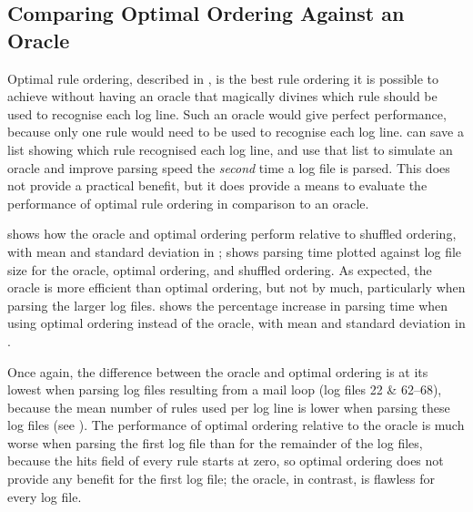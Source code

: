 
\FloatBarrier{}

\subsection{Comparing Optimal Ordering Against an Oracle}

\label{perfect rule ordering}

Optimal rule ordering, described in , is the best rule ordering it is possible to achieve without
having an oracle that magically divines which rule should be used to
recognise each log line.  Such an oracle would give perfect performance,
because only one rule would need to be used to recognise each log line.
\parsername{} can save a list showing which rule recognised each log line,
and use that list to simulate an oracle and improve parsing speed the
\textit{second\/} time a log file is parsed.  This does not provide a
practical benefit, but it does provide a means to evaluate the performance
of optimal rule ordering in comparison to an oracle.

 shows how the oracle and optimal ordering perform
relative to shuffled ordering, with mean and standard deviation in
;  shows parsing
time plotted against log file size for the oracle, optimal ordering, and
shuffled ordering.  As expected, the oracle is more efficient than optimal
ordering, but not by much, particularly when parsing the larger log files.
 shows the percentage increase in parsing time
when using optimal ordering instead of the oracle, with mean and standard
deviation in .

Once again, the difference between the oracle and optimal ordering is at
its lowest when parsing log files resulting from a mail loop (log files 22
\& 62--68), because the mean number of rules used per log line is lower
when parsing these log files (see ).  The performance of optimal ordering relative to the oracle is
much worse when parsing the first log file than for the remainder of the
log files, because the hits field of every rule starts at zero, so optimal
ordering does not provide any benefit for the first log file; the oracle,
in contrast, is flawless for every log file.

